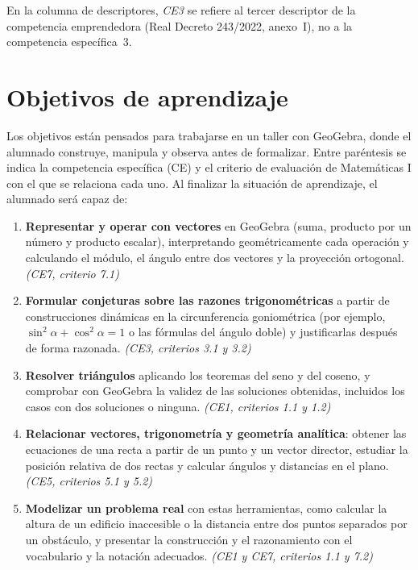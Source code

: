 \documentclass[11pt,a4paper]{article}
\begin{document}
\smallskip
{\footnotesize\color{gris} En la columna de descriptores, \emph{CE3} se
refiere al tercer descriptor de la competencia emprendedora (Real Decreto
243/2022, anexo~I), no a la competencia específica~3.}

\section{Objetivos de aprendizaje}
\label{sec:objetivos}
Los objetivos están pensados para trabajarse en un taller con GeoGebra, donde
el alumnado construye, manipula y observa antes de formalizar. Entre
paréntesis se indica la competencia específica (CE) y el criterio de
evaluación de Matemáticas I con el que se relaciona cada uno. Al finalizar la
situación de aprendizaje, el alumnado será capaz de:

\begin{enumerate}[label=\textbf{O\arabic*.}, leftmargin=*]
  \item \textbf{Representar y operar con vectores} en GeoGebra (suma, producto
    por un número y producto escalar), interpretando geométricamente cada
    operación y calculando el módulo, el ángulo entre dos vectores y la
    proyección ortogonal. \emph{(CE7, criterio 7.1)}
  \item \textbf{Formular conjeturas sobre las razones trigonométricas} a partir
    de construcciones dinámicas en la circunferencia goniométrica (por
    ejemplo, $\sin^2\alpha+\cos^2\alpha=1$ o las fórmulas del ángulo doble) y
    justificarlas después de forma razonada. \emph{(CE3, criterios 3.1 y 3.2)}
  \item \textbf{Resolver triángulos} aplicando los teoremas del seno y del
    coseno, y comprobar con GeoGebra la validez de las soluciones obtenidas,
    incluidos los casos con dos soluciones o ninguna. \emph{(CE1, criterios
    1.1 y 1.2)}
  \item \textbf{Relacionar vectores, trigonometría y geometría analítica}:
    obtener las ecuaciones de una recta a partir de un punto y un vector
    director, estudiar la posición relativa de dos rectas y calcular ángulos y
    distancias en el plano. \emph{(CE5, criterios 5.1 y 5.2)}
  \item \textbf{Modelizar un problema real} con estas herramientas, como
    calcular la altura de un edificio inaccesible o la distancia entre dos
    puntos separados por un obstáculo, y presentar la construcción y el
    razonamiento con el vocabulario y la notación adecuados. \emph{(CE1 y CE7,
    criterios 1.1 y 7.2)}
\end{enumerate}
\end{document}
